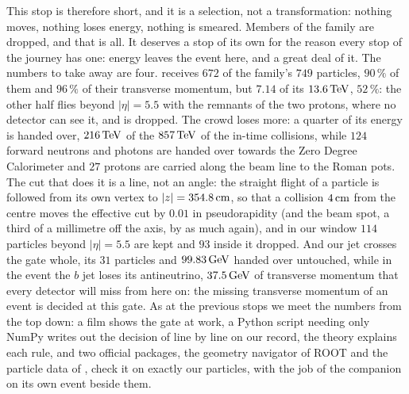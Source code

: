 This stop is therefore short, and it is a selection, not a
transformation: nothing moves, nothing loses energy, nothing is smeared.
Members of the family are dropped, and that is all. It deserves a stop of
its own for the reason every stop of the journey has one: energy leaves the
event here, and a great deal of it. The numbers to take away are four.
\GEANT receives $672$ of the family's $749$ particles, $90\,\%$ of them and
$96\,\%$ of their transverse momentum, but $7.14$ of its $13.6\,\mathrm{TeV}$, $52\,\%$:
the other half flies beyond $|\eta|=5.5$ with the remnants of the two
protons, where no detector can see it, and is dropped. The crowd loses
more: a quarter of its energy is handed over, $216\,\mathrm{TeV}$ of the $857\,\mathrm{TeV}$ of
the in-time collisions, while $124$ forward neutrons and photons are
handed over towards the Zero Degree Calorimeter and $27$ protons are
carried along the beam line to the Roman pots. The cut that does it is a line, not an angle: the
straight flight of a particle is followed from its own vertex to
$|z|=354.8\,\mathrm{cm}$, so that a collision $4\,\mathrm{cm}$ from the centre moves the
effective cut by $0.01$ in pseudorapidity (and the beam spot, a third of a
millimetre off the axis, by as much again), and in our window $114$
particles beyond $|\eta|=5.5$ are kept and $93$ inside it dropped. And our
jet crosses the gate whole, its $31$ particles and $99.83\,\mathrm{GeV}$ handed over
untouched, while in the \CMSSW event the $b$ jet loses its
antineutrino, $37.5\,\mathrm{GeV}$ of transverse momentum that every detector will
miss from here on: the missing transverse momentum of an event is decided
at this gate. As at the previous stops we meet the numbers from the top
down: a film shows the gate at work, a Python script needing only NumPy
writes out the decision of  line by line on our record,
the theory explains each rule, and two official packages, the geometry
navigator of ROOT and the particle data of \PYTHIA, check it on exactly our
particles, with the \CMSSW job of the companion on its own event beside
them.

